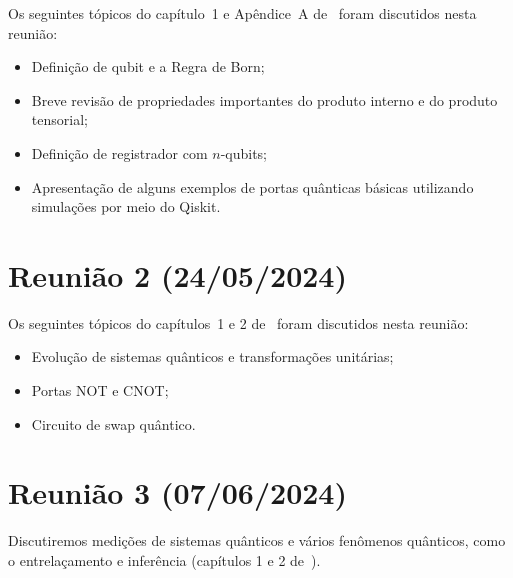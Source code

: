 \documentclass{article}
\begin{document}
Os seguintes tópicos do capítulo~1 e Apêndice~A de~\cite{deWolfLectureNotes} foram discutidos nesta reunião:
\begin{itemize}
    \item Definição de qubit e a Regra de Born;
    \item Breve revisão de propriedades importantes do produto interno e do produto tensorial;
    \item Definição de registrador com $n$-qubits;
    \item Apresentação de alguns exemplos de portas quânticas básicas utilizando simulações por meio do Qiskit.
\end{itemize}

\section*{Reunião 2 (24/05/2024)}

Os seguintes tópicos do capítulos~1 e 2 de~\cite{deWolfLectureNotes} foram discutidos nesta reunião:
\begin{itemize}
    \item Evolução de sistemas quânticos e transformações unitárias;
    \item Portas NOT e CNOT;
    \item Circuito de swap quântico.
\end{itemize}


\section*{Reunião 3 (07/06/2024)}

Discutiremos medições de sistemas quânticos e vários fenômenos quânticos,
como o entrelaçamento e inferência (capítulos 1 e 2 de~\cite{deWolfLectureNotes}).



\end{document}
